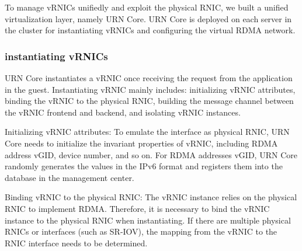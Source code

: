 To manage vRNICs unifiedly and exploit the physical RNIC, we built a unified virtualization layer, namely URN Core. URN Core is deployed on each server in the cluster for instantiating vRNICs and configuring the virtual RDMA network.


\subsubsection{instantiating vRNICs}
URN Core instantiates a vRNIC once receiving the request from the application in the guest. Instantiating vRNIC mainly includes: initializing vRNIC attributes, binding the vRNIC to the physical RNIC, building the message channel between the vRNIC frontend and backend, and isolating vRNIC instances.

Initializing vRNIC attributes: To emulate the interface as physical RNIC, URN Core needs to initialize the invariant properties of vRNIC, including RDMA address vGID, device number, and so on. For RDMA addresses vGID, URN Core randomly generates the values in the IPv6 format and registers them into the database in the management center.

Binding vRNIC to the physical RNIC: The vRNIC instance relies on the physical RNIC to implement RDMA. Therefore, it is necessary to bind the vRNIC instance to the physical RNIC when instantiating. If there are multiple physical RNICs or interfaces (such as SR-IOV), the mapping from the vRNIC to the RNIC interface needs to be determined.

